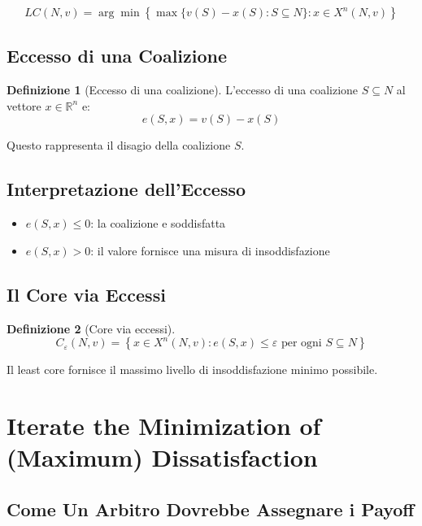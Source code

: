 \documentclass[12pt,a4paper]{article}
\theoremstyle{definition}
\newtheorem{definition}{Definizione}[section]
\begin{document}
\[
LC(N, v) = \arg \min \left\{ \max\{v(S) - x(S) : S \subseteq N\} : x \in X^n(N, v) \right\}
\]

\subsection*{Eccesso di una Coalizione}

\begin{definition}[Eccesso di una coalizione]
L'eccesso di una coalizione $S \subseteq N$ al vettore $x \in \mathbb{R}^n$ e:
\[
e(S, x) = v(S) - x(S)
\]
\end{definition}

Questo rappresenta il disagio della coalizione $S$.

\subsection*{Interpretazione dell'Eccesso}

\begin{itemize}
    \item $e(S, x) \leq 0$: la coalizione e soddisfatta

    \item $e(S, x) > 0$: il valore fornisce una misura di insoddisfazione
\end{itemize}

\subsection*{Il Core via Eccessi}

\begin{definition}[Core via eccessi]
\[
C_\varepsilon(N, v) = \left\{ x \in X^n(N, v) : e(S, x) \leq \varepsilon \text{ per ogni } S \subseteq N \right\}
\]
\end{definition}

Il least core fornisce il massimo livello di insoddisfazione minimo possibile.

\newpage

\section{Iterate the Minimization of (Maximum) Dissatisfaction}

\subsection*{Come Un Arbitro Dovrebbe Assegnare i Payoff}
\end{document}
